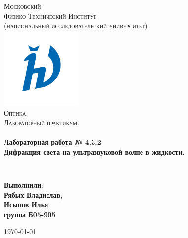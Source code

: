 \documentclass[a4paper,12pt]{article}
\begin{document}
\begin{titlepage}
	\begin{center}
		
		\textsc{\LARGE Московский\\[-0.2cm]Физико-Технический Институт\\[0.1cm]\large (национальный исследовательский университет)}\\[1.5cm] 
		
	\includegraphics[width=0.3\textwidth]{hv_s_no_bg.png}~\\[1cm]

	\textsc{\Large Оптика. \\ Лабораторный практикум. }\\[0.2cm]

	\HRule \\[0.4cm]
	{ \LARGE \bfseries Лабораторная работа № 4.3.2 \\ Дифракция света на ультразвуковой волне в жидкости. \\[0.4cm] }

	\HRule \\[1.5cm]
		
		\noindent
		\begin{minipage}{0.4\textwidth}
			\begin{flushleft} \large
			\end{flushleft}
		\end{minipage}%
		\begin{minipage}{0.4\textwidth}
			\begin{flushright} \large
			\end{flushright}
		\end{minipage}
		
		
		\large{\begin{flushright}
				\vfill
				\textbf{Выполнили}:\\
				\textbf{Рябых Владислав,\\}
				\textbf{Исыпов Илья\\}
				\textbf{группа Б05-905}
		\end{flushright}}
		
		
		{\large \today}\\
		
		
	\end{center}
\end{titlepage}
\end{document}
